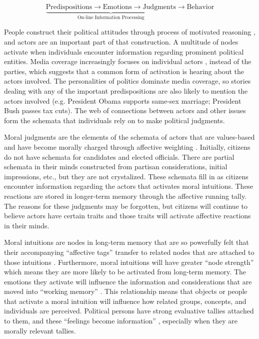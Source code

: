 \begin{center}
    \begin{equation*}
        \underbrace{\text{Predispositions} \longrightarrow \text{Emotions} \longrightarrow \text{Judgments}}_\text{On-line Information Processing} \longrightarrow \text{Behavior}
    \end{equation*}
\end{center}

People construct their political attitudes through process of motivated reasoning \cite{TaberLodgeGlathar2001}, and actors are an important part of that construction. A multitude of nodes activate when individuals encounter information regarding prominent political entities. Media coverage increasingly focuses on individual actors \cite{McAllister2007}, instead of the parties, which suggests that a common form of activation is hearing about the actors involved. The personalities of politics dominate media coverage, so stories dealing with any of the important predispositions are also likely to mention the actors involved (e.g. President Obama supports same-sex marriage; President Bush passes tax cuts). The web of connections between actors and other issues form the schemata that individuals rely on to make political judgments.

Moral judgments are the elements of the schemata of actors that are values-based and have become morally charged through affective weighting \cite{TaberLodgeGlathar2001}. Initially, citizens do not have schemata for candidates and elected officials. There are partial schemata in their minds constructed from partisan considerations, initial impressions, etc., but they are not crystalized. These schemata fill in as citizens encounter information regarding the actors that activates moral intuitions. These reactions are stored in longer-term memory through the affective running tally. The reasons for these judgments may be forgotten, but citizens will continue to believe actors have certain traits and those traits will activate affective reactions in their minds.

Moral intuitions are nodes in long-term memory that are so powerfully felt that their accompanying ``affective tags'' transfer to related nodes that are attached to those intuitions \cite{Haidt2001,Haidt2012}. Furthermore, moral intuitions will have greater ``node strength'' which means they are more likely to be activated from long-term memory. The emotions they activate will influence the information and considerations that are moved into ``working memory'' \cite[202-203]{TaberLodgeGlathar2001}. This relationship means that objects or people that activate a moral intuition will influence how related groups, concepts, and individuals are perceived. Political persons have strong evaluative tallies attached to them, and these ``feelings become information'' \cite[456]{LodgeTaber2005}, especially when they are morally relevant tallies.

